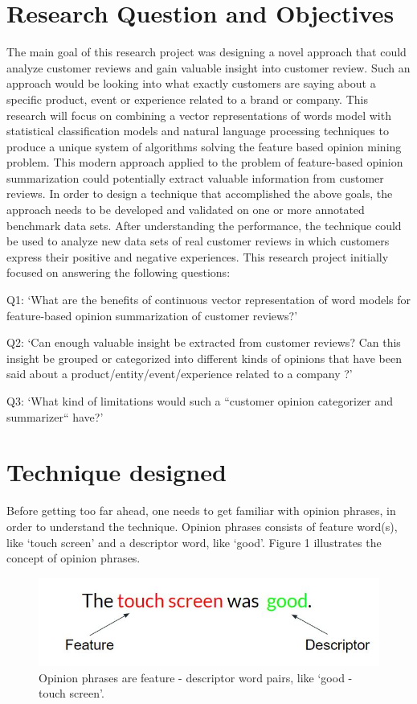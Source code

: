 \documentclass{sig-alternate}
\begin{document}
\section{Research Question and Objectives}
The main goal of this research project was designing a novel approach that could analyze customer reviews and gain valuable insight into customer review. Such an approach would be looking into what exactly customers are saying about a specific product, event or experience related to a brand or company. This research will focus on combining a vector representations of words model with statistical classification models and natural language processing techniques  to produce a unique system of algorithms solving the feature based opinion mining problem. This modern approach applied to the problem of feature-based opinion summarization could potentially extract valuable information from customer reviews.
In order to design a technique that accomplished the above goals, the approach needs to be developed and validated on one or more annotated benchmark data sets. After understanding the performance, the technique could be used to analyze new data sets of real customer reviews in which customers express their positive and negative experiences. This research project initially focused on answering the following questions: 

Q1: `What are the benefits of continuous vector representation of word models for feature-based opinion summarization of customer reviews?'

Q2: `Can enough valuable insight be extracted from customer reviews? Can this insight be grouped or categorized into different kinds of opinions that have been said about a product/entity/event/experience related to a company ?'

Q3: `What kind of limitations would such a ``customer opinion categorizer and summarizer``  have?'

\section{Technique designed}
Before getting too far ahead, one needs to get familiar with opinion phrases, in order to understand the technique. Opinion phrases consists of feature word(s), like `touch screen' and a descriptor word, like `good'. Figure 1 illustrates the concept of opinion phrases. \\
\begin{figure}
\centering
\includegraphics[scale=0.65]{images/FD_words.JPG}
\caption{Opinion phrases are feature - descriptor word pairs, like `good - touch screen'.}
\end{figure}
\end{document}
